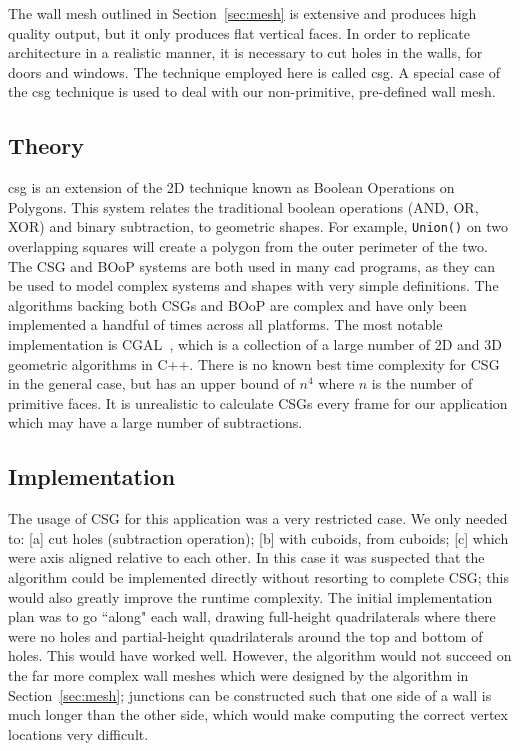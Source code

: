 The wall mesh outlined in Section~\ref{sec:mesh} is extensive and produces high quality output, but it only produces flat vertical faces. In order to replicate architecture in a realistic manner, it is necessary to cut holes in the walls, for doors and windows. The technique employed here is called \acrlong{csg}. A special case of the \acrshort{csg} technique is used to deal with our non-primitive, pre-defined wall mesh.

\subsection{Theory}

\acrlong{csg} is an extension of the 2D technique known as Boolean Operations on Polygons. This system relates the traditional boolean operations (AND, OR, XOR) and binary subtraction, to geometric shapes. For example, \verb|Union()| on two overlapping squares will create a polygon from the outer perimeter of the two. The CSG and BOoP systems are both used in many \acrlong{cad} programs, as they can be used to model complex systems and shapes with very simple definitions. The algorithms backing both CSGs and BOoP are complex and have only been implemented a handful of times across all platforms. The most notable implementation is CGAL~\cite{cgal},  which is a collection of a large number of 2D and 3D geometric algorithms in C++. There is no known best time complexity for CSG in the general case, but \cite{csgsub} has an upper bound of $n^4$ where $n$ is the number of primitive faces. It is unrealistic to calculate CSGs every frame for our application which may have a large number of subtractions.


\subsection{Implementation}
\label{sec:csgimp}

The usage of CSG for this application was a very restricted case. We only needed to: [a] cut holes (subtraction operation); [b] with cuboids, from cuboids; [c] which were axis aligned relative to each other. In this case it was suspected that the algorithm could be implemented directly without resorting to complete CSG; this would also greatly improve the runtime complexity. The initial implementation plan was to go ``along" each wall, drawing full-height quadrilaterals where there were no holes and partial-height quadrilaterals around the top and bottom of holes. This would have worked well. However, the algorithm would not succeed on the far more complex wall meshes which were designed by the algorithm in Section~\ref{sec:mesh}; junctions can be constructed such that one side of a wall is much longer than the other side, which would make computing the correct vertex locations very difficult.

